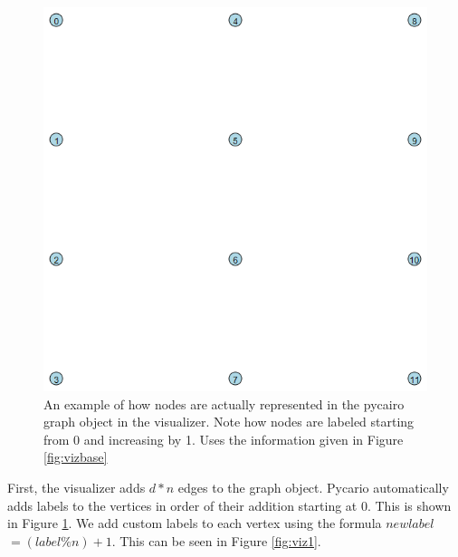 \begin{figure}[t!]
    \centering
    \begin{minipage}{0.45\textwidth}
        \centering
        \includegraphics[width=\textwidth]{images/viz0.png}
        \caption{An example of how nodes are actually represented in the pycairo graph object in the visualizer. Note how nodes are labeled starting from 0 and increasing by 1. Uses the information given in Figure \ref{fig:vizbase}}
        \label{fig:viz0}
    \end{minipage}
    \hfill
\end{figure}

First, the visualizer adds $d * n$ edges to the graph object. Pycario automatically adds 
labels to the vertices in order of their addition starting at 0. This is shown in Figure
\ref{fig:viz0}. We add custom labels to each vertex using the formula 
$new label$ $=(label \% n) + 1$. This can be seen in Figure \ref{fig:viz1}.

